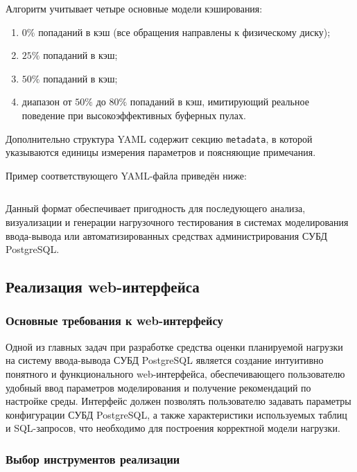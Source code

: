 Алгоритм учитывает четыре основные модели кэширования:
\begin{enumerate}
    \item $0\%$ попаданий в кэш (все обращения направлены к физическому диску);
    \item $25\%$ попаданий в кэш;
    \item $50\%$ попаданий в кэш;
    \item диапазон от $50\%$ до $80\%$ попаданий в кэш, имитирующий реальное поведение при высокоэффективных буферных пулах.
\end{enumerate}

Дополнительно структура YAML содержит секцию \texttt{metadata}, в которой указываются единицы измерения параметров и поясняющие примечания.

Пример соответствующего YAML-файла приведён ниже:
\begin{quote}
\footnotesize
\begin{verbatim}

\end{verbatim}
\end{quote}

Данный формат обеспечивает пригодность для последующего анализа, визуализации и генерации нагрузочного тестирования в системах моделирования ввода-вывода или автоматизированных средствах администрирования СУБД PostgreSQL.




\subsection{Реализация web-интерфейса}
\subsubsection{Основные требования к web-интерфейсу}

Одной из главных задач при разработке средства оценки пла\-ни\-руемой наг\-руз\-ки на систему ввода-вывода СУБД PostgreSQL является создание интуитивно понятного и функционального web-интерфейса, обеспечивающего пользователю удобный ввод параметров моделирования и получение рекомендаций по настройке среды. Интерфейс должен позволять пользователю задавать параметры конфигурации СУБД PostgreSQL, а также характеристики используемых таблиц и SQL-запросов, что необходимо для построения корректной модели нагрузки.


\subsubsection{Выбор инструментов реализации}

